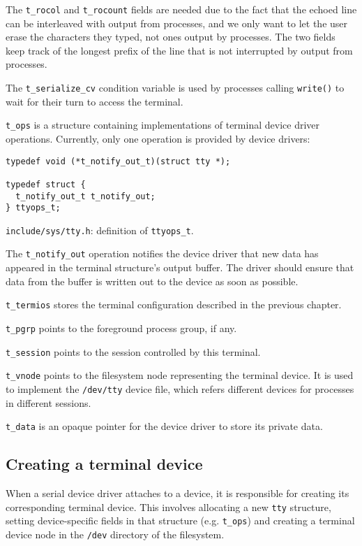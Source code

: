 \documentclass[shortabstract, manyadvisors, english, mgr]{iithesis}
\begin{document}
The \texttt{t\_rocol} and \texttt{t\_rocount} fields are needed due to the fact
that the echoed line can be interleaved with output from processes, and we only
want to let the user erase the characters they typed, not ones output by
processes. The two fields keep track of the longest prefix of the line that is
not interrupted by output from processes.

The \texttt{t\_serialize\_cv} condition variable is used by processes calling
\texttt{write()} to wait for their turn to access the terminal.

\texttt{t\_ops} is a structure containing implementations of terminal device
driver operations. Currently, only one operation is provided by device drivers:

\begin{listing}[H]
\begin{verbatim}
typedef void (*t_notify_out_t)(struct tty *);

typedef struct {
  t_notify_out_t t_notify_out;
} ttyops_t;
\end{verbatim}
\caption{\texttt{include/sys/tty.h}: definition of \texttt{ttyops\_t}.}
\end{listing}
The \texttt{t\_notify\_out} operation notifies the device driver that new data
has appeared in the terminal structure's output buffer. The driver should ensure
that data from the buffer is written out to the device as soon as possible.

\texttt{t\_termios} stores the terminal configuration described in the previous
chapter.

\texttt{t\_pgrp} points to the foreground process group, if any.

\texttt{t\_session} points to the session controlled by this terminal.

\texttt{t\_vnode} points to the filesystem node representing the terminal
device. It is used to implement the \texttt{/dev/tty} device file, which refers
different devices for processes in different sessions.

\texttt{t\_data} is an opaque pointer for the device driver to store its private
data.

\subsection{Creating a terminal device}

When a serial device driver attaches to a device, it is responsible for creating
its corresponding terminal device. This involves allocating a new \texttt{tty}
structure, setting device-specific fields in that structure (e.g.
\texttt{t\_ops}) and creating a terminal device node in the \texttt{/dev}
directory of the filesystem.
\end{document}

